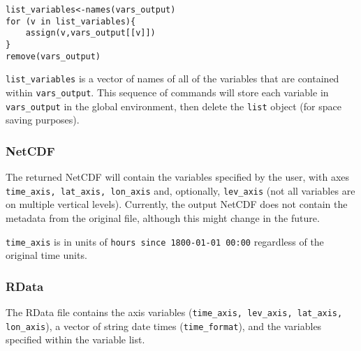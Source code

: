 \documentclass{article}
\begin{document}
\begin{verbatim}
list_variables<-names(vars_output)
for (v in list_variables){
    assign(v,vars_output[[v]])
}
remove(vars_output)
\end{verbatim}
\texttt{list\_variables} is a vector of names of all of the variables that are contained within \texttt{vars\_output}. This sequence of commands will store each variable in \texttt{vars\_output} in the global environment, then delete the \texttt{list} object (for space saving purposes).
\subsubsection{NetCDF}
The returned NetCDF will contain the variables specified by the user, with axes \texttt{time\_axis, lat\_axis, lon\_axis} and, optionally, \texttt{lev\_axis} (not all variables are on multiple vertical levels). Currently, the output NetCDF does not contain the metadata from the original file, although this might change in the future.

\texttt{time\_axis} is in units of \texttt{hours since 1800-01-01 00:00} regardless of the original time units. 

\subsubsection{RData}

The RData file contains the axis variables (\texttt{time\_axis, lev\_axis, lat\_axis, lon\_axis}), a vector of string date times (\texttt{time\_format}), and the variables specified within the variable list. 

\pagebreak
\end{document}
